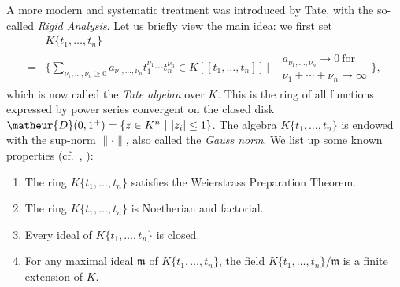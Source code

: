 A more modern and systematic treatment was introduced by Tate, 
with the so-called {\it Rigid Analysis}.
Let us briefly view the main idea:
we first set
\begin{align*}
   & K\{t_1,\ldots,t_n\}\\
 = & \Biggl\{
 \sum_{\nu_1,\ldots,\nu_n\geq 0}
 a_{\nu_1,\ldots,\nu_n}t_1^{\nu_1}\cdots t_n^{\nu_n}
  \in K[[t_1,\ldots,t_n]]\,
 \Bigg|
 \begin{split}
  & a_{\nu_1,\ldots,\nu_n}\rightarrow 0\ \mathrm{for}\\
  & \nu_1+\cdots+\nu_n\rightarrow\infty
 \end{split} 
\Biggr\},
\end{align*}
which is now called the {\it Tate algebra} over $K$.
This is the ring of all functions expressed by power series convergent
on the closed disk $\matheur{D}(0,1^{+})=\{z\in K^n\ |\ |z_i|\leq 1\}$.
The algebra $K\{t_1,\ldots,t_n\}$ is endowed with the sup-norm 
$\|\cdot\|$, also called the {\it Gauss norm}.
We list up some known properties (cf.\ \cite[5.2]{na},
\cite[II.3]{garea}):

\begin{enumerate}
\item The ring $K\{t_1,\ldots,t_n\}$ satisfies the Weierstrass
Preparation Theorem.
\item The ring $K\{t_1,\ldots,t_n\}$ is Noetherian and factorial.
\item Every ideal of $K\{t_1,\ldots,t_n\}$ is closed.
\item For any maximal ideal $\mathfrak{m}$ of $K\{t_1,\ldots,t_n\}$, the
field $K\{t_1,\ldots,t_n\}/\mathfrak{m}$ is a finite extension of $K$.
\end{enumerate}


